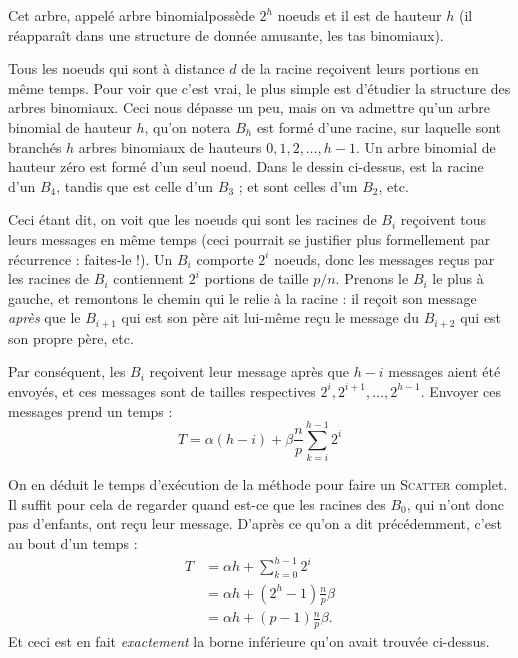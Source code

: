 Cet arbre, appelé \og arbre binomial\fg possède $2^h$ noeuds et il est
de hauteur $h$ (il réapparaît dans une structure de donnée amusante,
les \og tas binomiaux\fg).

Tous les noeuds qui sont à distance $d$ de la racine reçoivent leurs portions en
même temps. Pour voir que c'est vrai, le plus simple est d'étudier la structure
des arbres binomiaux. Ceci nous dépasse un peu, mais on va admettre qu'un arbre
binomial de hauteur $h$, qu'on notera $B_h$ est formé d'une racine, sur laquelle
sont branchés $h$ arbres binomiaux de hauteurs $0,1, 2, \dots, h-1$. Un arbre
binomial de hauteur zéro est formé d'un seul noeud. Dans le dessin ci-dessus,
\fg est la racine d'un $B_4$, tandis que \fg est celle d'un $B_3$ ;
\fg et \fg sont celles d'un $B_2$, etc.

Ceci étant dit, on voit que les noeuds qui sont les racines de $B_i$ reçoivent
tous leurs messages en même temps (ceci pourrait se justifier plus formellement
par récurrence : faites-le !). Un $B_i$ comporte $2^i$ noeuds, donc les messages
reçus par les racines de $B_i$ contiennent $2^i$ portions de taille
$p/n$. Prenons le $B_i$ le plus à gauche, et remontons le chemin qui le relie à
la racine : il reçoit son message \emph{après} que le $B_{i+1}$ qui est son père
ait lui-même reçu le message du $B_{i+2}$ qui est son propre père, etc.

Par conséquent, les $B_i$ reçoivent leur message après que $h-i$ messages aient
été envoyés, et ces messages sont de tailles respectives
$2^i, 2^{i+1}, \dots, 2^{h-1}$. Envoyer ces messages prend un temps :
\[
T = \alpha (h-i) + \beta \frac{n}{p}  \sum_{k=i}^{h-1} 2^i
\]

On en déduit le temps d'exécution de la méthode pour faire un \textsc{Scatter}
complet. Il suffit pour cela de regarder quand est-ce que les racines des $B_0$,
qui n'ont donc pas d'enfants, ont reçu leur message. D'après ce qu'on a dit
précédemment, c'est au bout d'un temps :
\begin{align*}
T &= \alpha  h + \sum_{k=0}^{h-1} 2^i\\
  &= \alpha  h + \left(2^h -1 \right) \frac{n}{p}  \beta \\
  &= \alpha  h + \left(p -1 \right)  \frac{n}{p} \beta.
\end{align*}
Et ceci est en fait \emph{exactement} la borne inférieure qu'on avait
trouvée ci-dessus.


